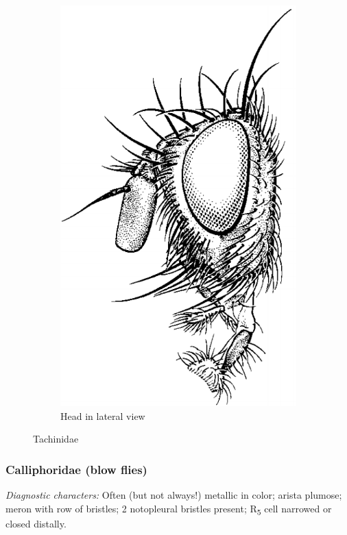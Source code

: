 \documentclass[letterpaper, 11pt]{article}
\begin{document}
\begin{figure}[ht!]
\begin{subfigure}[ht!]{0.21\textwidth}
        \includegraphics[width=\textwidth]{TachinidHead}
        \caption{Head in lateral view \citep[][Fig. 110.91]{mcalpine1981manualv2}}
        \label{fig:tachinid2}
    \end{subfigure}
    \caption{Tachinidae}\label{fig:tachinids}
\end{figure}

\subsubsection{Calliphoridae (blow flies)}
\noindent{}\textit{Diagnostic characters:} Often (but not always!) metallic in color; arista plumose; meron with row of bristles; 2 notopleural bristles present; \texorpdfstring{R\textsubscript{5}}{R5} cell narrowed or closed distally.\\
\end{document}
